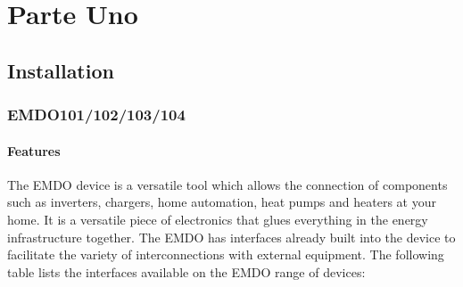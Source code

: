 \documentclass[11pt,fleqn]{book} %
\numberwithin{equation}{section} %
\numberwithin{figure}{section} %
\numberwithin{table}{section} %
\begin{document}




\pagestyle{empty} %

 \tableofcontents %

\cleardoublepage %

\pagestyle{fancy} %


\part{Parte Uno}



\chapter{Installation}
\section{EMDO101/102/103/104}
\subsection{Features}
The EMDO device is a versatile tool which allows the connection of components such as inverters, chargers, home automation, heat pumps and heaters at your home. It is a versatile piece of electronics that glues everything in the energy infrastructure together.
The EMDO has interfaces already built into the device to facilitate the variety of interconnections with external equipment. The following table lists the interfaces available on the EMDO range of devices:
\end{document}

